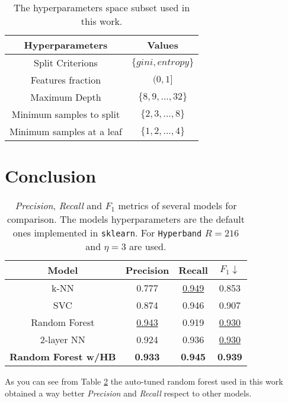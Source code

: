 \documentclass[11pt, a4paper]{article}
\begin{document}
  \begin{table}
    \centering
    \begin{tabular}{|c c|}
      \hline
      Hyperparameters & Values \\
      \hline\hline
      Split Criterions & $\{gini, entropy\}$ \\
      \hline
      Features fraction & $(0, 1]$ \\
      \hline
      Maximum Depth & $\{8,9,...,32\}$ \\
      \hline
      Minimum samples to split & $\{2,3,...,8\}$ \\
      \hline
      Minimum samples at a leaf & $\{1,2,...,4\}$ \\
      \hline
    \end{tabular}
    \caption{The hyperparameters space subset used in this work.}
    \label{table:hyperparameters}
  \end{table}

\section{Conclusion}
\begin{table}
  \centering
  \begin{tabular}{|c c c c|}
    \hline
    Model & Precision & Recall & $F_{1} \downarrow$  \\
    \hline\hline
    k-NN & 0.777 & \underline{0.949} & 0.853 \\
    \hline
    SVC & 0.874 & 0.946 & 0.907 \\
    \hline
    Random Forest & \underline{0.943} & 0.919 & \underline{0.930} \\
    \hline
    2-layer NN & 0.924 & 0.936 & \underline{0.930} \\
    \hline
    \textbf{Random Forest w/HB} & \textbf{0.933} & \textbf{0.945} & \textbf{0.939} \\
    \hline
  \end{tabular}
  \caption{\textit{Precision}, \textit{Recall} and $F_{1}$ metrics of several models for comparison. The models hyperparameters are the default ones implemented in \texttt{sklearn}. For \texttt{Hyperband} $R=216$ and $\eta=3$ are used.}
  \label{table:benchmark}
\end{table}

  As you can see from Table \ref{table:benchmark} the auto-tuned random forest used in this work obtained a way better \textit{Precision} and \textit{Recall} respect to other models.
\end{document}
